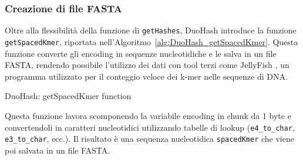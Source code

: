 \subsubsection*{Creazione di file FASTA}
Oltre alla flessibilità della funzione di \verb|getHashes|, DuoHash introduce la funzione \verb|getSpacedKmer|, riportata nell'Algoritmo~\ref{alg:DuoHash_getSpacedKmer}. Questa funzione converte gli encoding in sequenze nucleotidiche e le salva in un file FASTA, rendendo possibile l'utilizzo dei dati con tool terzi come JellyFish \cite{marcais2011jellyfish}, un programma utilizzato per il conteggio veloce dei k-mer nelle sequenze di \acs{DNA}.

\begin{algorithm}[!ht]
	\caption{DuoHash: getSpacedKmer function}
	\label{alg:DuoHash_getSpacedKmer}
	
\end{algorithm}

Questa funzione lavora scomponendo la variabile encoding in chunk da 1 byte e convertendoli in caratteri nucleotidici utilizzando tabelle di lookup (\verb|e4_to_char|, \verb|e3_to_char|, ecc.). Il risultato è una sequenza nucleotidica \verb|spacedKmer| che viene poi salvata in un file FASTA.
